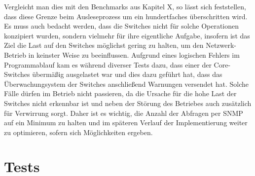 Vergleicht man dies mit den Benchmarks aus Kapitel X, so lässt sich feststellen, dass diese Grenze beim Ausleseprozess um ein hundertfaches überschritten wird. Es muss auch bedacht werden, dass die Switches nicht für solche Operationen konzipiert wurden, sondern vielmehr für ihre eigentliche Aufgabe, insofern ist das Ziel die Last auf den Switches möglichst gering zu halten, um den Netzwerk-Betrieb in keinster Weise zu beeinflussen. Aufgrund eines logischen Fehlers im Programmablauf kam es während diverser Tests dazu, dass einer der Core-Switches übermäßig ausgelastet war und dies dazu geführt hat, dass das Überwachungsystem der Switches anschließend Warnungen versendet hat. Solche Fälle dürfen im Betrieb nicht passieren, da die Ursache für die hohe Last der Switches nicht erkennbar ist und neben der Störung des Betriebes auch zusätzlich für Verwirrung sorgt. Daher ist es wichtig, die Anzahl der Abfragen per SNMP auf ein Minimum zu halten und im späteren Verlauf der Implementierung weiter zu optimieren, sofern sich Möglichkeiten ergeben.

\section{Tests}
\label{sec:tests}

